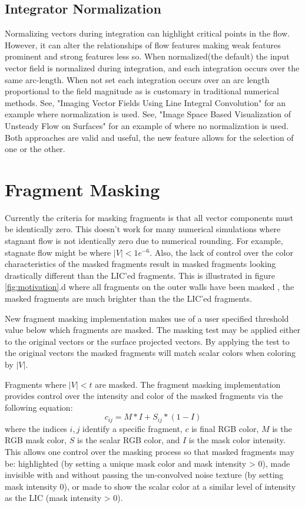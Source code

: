 \documentclass[a4paper,10pt]{article}
\begin{document}
\subsection{Integrator Normalization}
Normalizing vectors during integration can highlight critical points in the flow. However, it can alter the relationships of flow features making weak features prominent and strong features less so. When normalized(the default) the input vector field is normalized during integration, and each integration occurs over the same arc-length. When not set each integration occurs over an arc length proportional to the field magnitude as is customary in traditional numerical methods. See, "Imaging Vector Fields Using Line Integral Convolution" for an example where normalization is used. See, "Image Space Based Visualization of Unsteady Flow on Surfaces" for an example of where no normalization is used. Both approaches are valid and useful, the new feature allows for the selection of one or the other.

\section{Fragment Masking}
\label{sec:mask}
Currently the criteria for masking fragments is that all vector components must be identically zero. This doesn't work for many numerical simulations where stagnant flow is not identically zero due to numerical rounding. For example, stagnate flow might be where $|V|<1e^{-6}$. Also, the lack of control over the color characteristics of the masked fragments result in masked fragments looking drastically different than the LIC'ed fragments. This is illustrated in figure \ref{fig:motivation}.d where all fragments on the outer walls have been masked , the masked fragments are much brighter than the the LIC'ed fragments.

New fragment masking implementation makes use of a user specified threshold value below which fragments are masked. The masking test may be applied either to the original vectors or the surface projected vectors. By applying the test to the original vectors the masked fragments will match scalar colors when coloring by $|V|$. 

Fragments where $|V|<t$ are masked. The fragment masking implementation provides control over the intensity and color of the masked fragments via the following equation:
\begin{equation}
c_{ij} = M * I + S_{ij} * ( 1 - I )
\label{eqn:color-blend}
\end{equation}
where the indices $i,j$ identify a specific fragment, $c$ is final RGB color, $M$ is the RGB mask color, $S$ is the scalar RGB color, and $I$ is the mask color intensity. This allows one control over the masking process so that masked fragments may be: highlighted (by setting a unique mask color and mask intensity > 0), made invisible with and without passing the un-convolved noise texture (by setting mask intensity 0), or made to show the scalar color at a similar level of intensity as the LIC (mask intensity > 0).
\end{document}
